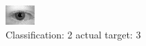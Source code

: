 \begin{figure}[h!]
\begin{center}
\includegraphics[width=0.60\columnwidth]{figures/ID601_class_2_target_3.png}
\end{center}
\caption{ Classification: 2 actual target: 3}
\label{fig:ID601_class_2_target_3}
\end{figure}
